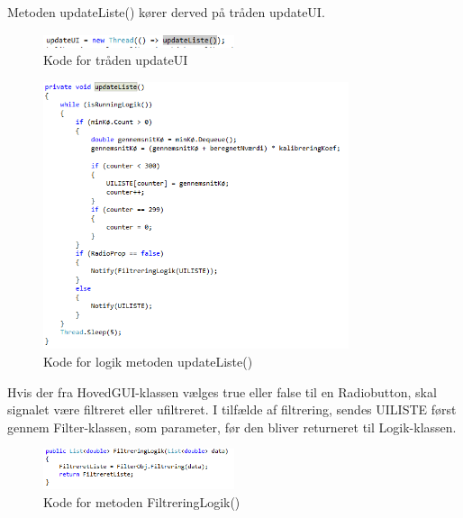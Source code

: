 Metoden updateListe() kører derved på tråden updateUI.

\begin{figure}[H]
	\centering
	\includegraphics[width=0.5\textwidth]{FigurerProgram/updateUI}
	\caption{Kode for tråden updateUI}
	\label{fig:UpdateUI}
\end{figure}

\begin{figure}[H]
	\centering
	\includegraphics[width=0.8\textwidth]{FigurerProgram/updateListe}
	\caption{Kode for logik metoden updateListe()}
	\label{fig:UpdateListe}
\end{figure}

Hvis der fra HovedGUI-klassen vælges true eller false til en Radiobutton, skal signalet være filtreret eller ufiltreret. I tilfælde af filtrering, sendes UILISTE først gennem Filter-klassen, som parameter, før den bliver returneret til Logik-klassen.

\begin{figure}[H]
	\centering
	\includegraphics[width=0.5\textwidth]{FigurerProgram/FiltreringLogik}
	\caption{Kode for metoden FiltreringLogik()}
	\label{fig:FiltreringLogik}
\end{figure}

